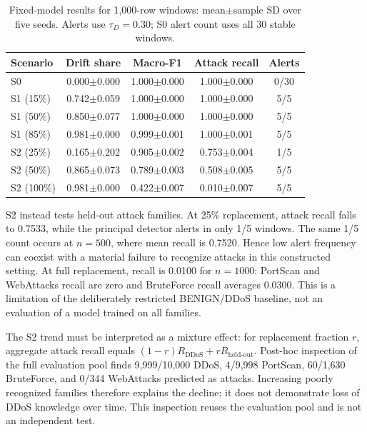 \documentclass[runningheads]{llncs}
\begin{document}
\begin{table}[t]
\caption{Fixed-model results for 1,000-row windows: mean$\pm$sample SD over five seeds. Alerts use $\tau_D=0.30$; S0 alert count uses all 30 stable windows.}
\label{tab:results}
\centering
\small
\begin{tabular*}{\linewidth}{@{\extracolsep{\fill}}lcccc@{}}
\toprule
Scenario & Drift share & Macro-F1 & Attack recall & Alerts \\
\midrule
S0 & 0.000$\pm$0.000 & 1.000$\pm$0.000 & 1.000$\pm$0.000 & 0/30 \\
S1 (15\%) & 0.742$\pm$0.059 & 1.000$\pm$0.000 & 1.000$\pm$0.000 & 5/5 \\
S1 (50\%) & 0.850$\pm$0.077 & 1.000$\pm$0.000 & 1.000$\pm$0.000 & 5/5 \\
S1 (85\%) & 0.981$\pm$0.000 & 0.999$\pm$0.001 & 1.000$\pm$0.001 & 5/5 \\
S2 (25\%) & 0.165$\pm$0.202 & 0.905$\pm$0.002 & 0.753$\pm$0.004 & 1/5 \\
S2 (50\%) & 0.865$\pm$0.073 & 0.789$\pm$0.003 & 0.508$\pm$0.005 & 5/5 \\
S2 (100\%) & 0.981$\pm$0.000 & 0.422$\pm$0.007 & 0.010$\pm$0.007 & 5/5 \\
\bottomrule
\end{tabular*}
\end{table}

S2 instead tests held-out attack families. At 25\% replacement, attack recall falls to 0.7533, while the principal detector alerts in only 1/5 windows. The same 1/5 count occurs at $n=500$, where mean recall is 0.7520. Hence low alert frequency can coexist with a material failure to recognize attacks in this constructed setting. At full replacement, recall is 0.0100 for $n=1000$: PortScan and WebAttacks recall are zero and BruteForce recall averages 0.0300. This is a limitation of the deliberately restricted BENIGN/DDoS baseline, not an evaluation of a model trained on all families.

The S2 trend must be interpreted as a mixture effect: for replacement fraction $r$, aggregate attack recall equals $(1-r)R_{\mathrm{DDoS}}+rR_{\mathrm{held\mbox{-}out}}$. Post-hoc inspection of the full evaluation pool finds 9,999/10,000 DDoS, 4/9,998 PortScan, 60/1,630 BruteForce, and 0/344 WebAttacks predicted as attacks. Increasing poorly recognized families therefore explains the decline; it does not demonstrate loss of DDoS knowledge over time. This inspection reuses the evaluation pool and is not an independent test.
\end{document}
